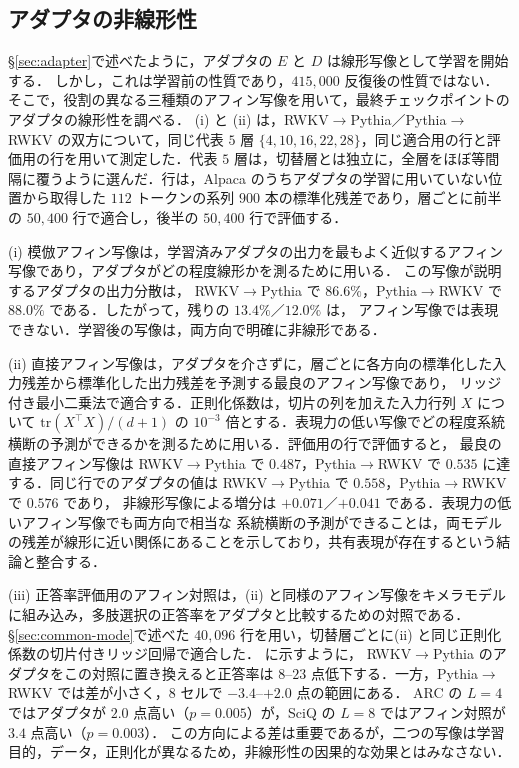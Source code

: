 \documentclass[techrep,noauthor]{ipsj}
\newcommand{\kw}[1]{#1}
\newcommand{\rev}[1]{{\color{blue}#1}}
\newcommand{\revr}[1]{{\color{red}#1}}
\newcommand{\revp}[1]{{\color{violet}#1}}
\newcommand{\revy}[1]{{\color{revyellow}#1}}
\newcommand{\RtoP}{\textsf{RWKV$\to$\allowbreak Pythia}}
\newcommand{\PtoR}{\textsf{Pythia$\to$\allowbreak RWKV}}
\begin{document}
\subsection{アダプタの非線形性}\label{sec:linear}
\revp{\S\ref{sec:adapter}で述べたように，アダプタの $E$ と $D$ は線形写像として学習を開始する．}
しかし，これは学習前の性質であり，$415{,}000$ 反復後の性質ではない．\rev{そこで，役割の異なる三種類のアフィン写像を用いて，最終チェックポイントのアダプタの線形性を調べる．
(i) と (ii) は，\RtoP{}／\PtoR{} の双方について，同じ代表 $5$ 層 $\{4,10,16,22,28\}$，同じ適合用の行と評価用の行を用いて測定した．\revp{代表 $5$ 層は，切替層とは独立に，全層をほぼ等間隔に覆うように選んだ．}\revy{行は，Alpaca のうちアダプタの学習に用いていない位置から取得した $112$ トークンの系列 $900$ 本の標準化残差であり，層ごとに前半の $50{,}400$ 行で適合し，後半の $50{,}400$ 行で評価する．}}

\rev{(i) 模倣アフィン写像は，学習済みアダプタの出力を最もよく近似するアフィン写像であり，アダプタがどの程度線形かを測るために用いる．
この写像が説明するアダプタの出力分散は，}
\RtoP{} で $86.6\%$，\PtoR{} で $88.0\%$ である．したがって，\kw{残りの $13.4\%$／$12.0\%$ は，
アフィン写像では表現できない}．学習後の写像は，両方向で明確に非線形である．

\rev{(ii) 直接アフィン写像は，アダプタを介さずに，層ごとに各方向の標準化した入力残差から標準化した出力残差を予測する最良のアフィン写像であり，
リッジ付き最小二乗法で適合する．\revy{正則化係数は，切片の列を加えた入力行列 $X$ について $\mathrm{tr}(X^{\top}X)/(d{+}1)$ の $10^{-3}$ 倍とする．}表現力の低い写像でどの程度系統横断の予測ができるかを測るために用いる．評価用の行で評価すると，}
最良の直接アフィン写像は \RtoP{} で $0.487$，\PtoR{} で $0.535$ に達する．同じ行でのアダプタの値は \RtoP{} で $0.558$，\PtoR{} で $0.576$ であり，
非線形写像による増分は $+0.071$／$+0.041$ である．\rev{表現力の低い}アフィン写像でも両方向で相当な
系統横断の予測ができることは，\revp{両モデルの残差が線形に近い関係にあることを示しており，共有表現が存在するという結論と整合する．}

\rev{(iii) 正答率評価用のアフィン対照は，(ii) と同様のアフィン写像をキメラモデルに組み込み，多肢選択の正答率をアダプタと比較するための対照である．
\revr{\S\ref{sec:common-mode}で述べた $40{,}096$ 行を用い，切替層ごとに\revy{(ii) と同じ正則化係数の}切片付きリッジ回帰で適合した．}\tabref{tab:bench} に示すように，
\RtoP{} のアダプタをこの対照に置き換えると正答率は $8$--$23$ 点低下する．一方，\PtoR{} では差が小さく，$8$ セルで $-3.4$--$+2.0$ 点の範囲にある．
ARC の $L{=}4$ ではアダプタが $2.0$ 点高い（$p{=}0.005$）が，SciQ の $L{=}8$ ではアフィン対照が $3.4$ 点高い（$p{=}0.003$）．
この方向による差は重要であるが，二つの写像は学習目的，データ，正則化が異なるため，非線形性の因果的な効果とはみなさない．}
\end{document}
